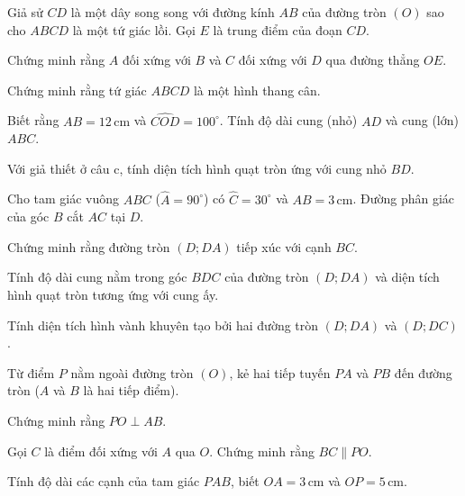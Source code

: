 \begin{practice}
\begin{questions}[resume=SBT]
        \item Giả sử $CD$ là một dây song song với đường kính $AB$ của đường tròn $(O)$ sao cho $ABCD$ là một tứ giác lồi. Gọi $E$ là trung điểm của đoạn $CD$.
        \begin{questions}
            \item Chứng minh rằng $A$ đối xứng với $B$ và $C$ đối xứng với $D$ qua đường thẳng $OE$.
            \item Chứng minh rằng tứ giác $ABCD$ là một hình thang cân.
            \item Biết rằng $AB=12\,\mathrm{cm}$ và $\widehat{COD}=100^\circ$. Tính độ dài cung (nhỏ) $AD$ và cung (lớn) $ABC$.
            \item Với giả thiết ở câu c, tính diện tích hình quạt tròn ứng với cung nhỏ $BD$.
        \end{questions}
        \answerline
        \answerline
        \answerline

        \item Cho tam giác vuông $ABC$ ($\widehat A=90^\circ$) có $\widehat C=30^\circ$ và $AB=3\,\mathrm{cm}$. Đường phân giác của góc $B$ cắt $AC$ tại $D$.
        \begin{questions}
            \item Chứng minh rằng đường tròn $(D;DA)$ tiếp xúc với cạnh $BC$.
            \item Tính độ dài cung nằm trong góc $BDC$ của đường tròn $(D;DA)$ và diện tích hình quạt tròn tương ứng với cung ấy.
            \item Tính diện tích hình vành khuyên tạo bởi hai đường tròn $(D;DA)$ và $(D;DC)$.
        \end{questions}
        \answerline
        \answerline
        \answerline

        \item Từ điểm $P$ nằm ngoài đường tròn $(O)$, kẻ hai tiếp tuyến $PA$ và $PB$ đến đường tròn ($A$ và $B$ là hai tiếp điểm).
        \begin{questions}
            \item Chứng minh rằng $PO\perp AB$.
            \item Gọi $C$ là điểm đối xứng với $A$ qua $O$. Chứng minh rằng $BC\parallel PO$.
            \item Tính độ dài các cạnh của tam giác $PAB$, biết $OA=3\,\mathrm{cm}$ và $OP=5\,\mathrm{cm}$.
        \end{questions}
        \answerline
        \answerline
        \answerline


\end{questions}
\end{practice}
